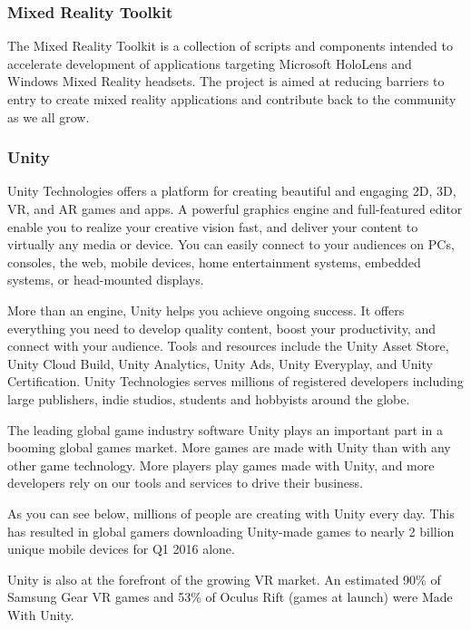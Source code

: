     \subsubsection{Mixed Reality Toolkit}
    The Mixed Reality Toolkit is a collection of scripts and components intended to accelerate development of applications targeting Microsoft HoloLens and Windows Mixed Reality headsets. The project is aimed at reducing barriers to entry to create mixed reality applications and contribute back to the community as we all grow. %

    \subsubsection{Unity}
    Unity Technologies offers a platform for creating beautiful and engaging 2D, 3D, VR, and AR games and apps. A powerful graphics engine and full-featured editor enable you to realize your creative vision fast, and deliver your content to virtually any media or device. You can easily connect to your audiences on PCs, consoles, the web, mobile devices, home entertainment systems, embedded systems, or head-mounted displays.

    More than an engine, Unity helps you achieve ongoing success. It offers everything you need to develop quality content, boost your productivity, and connect with your audience. Tools and resources include the Unity Asset Store, Unity Cloud Build, Unity Analytics, Unity Ads, Unity Everyplay, and Unity Certification. Unity Technologies serves millions of registered developers including large publishers, indie studios, students and hobbyists around the globe.
    
    The leading global game industry software
    Unity plays an important part in a booming global games market. More games are made with Unity than with any other game technology. More players play games made with Unity, and more developers rely on our tools and services to drive their business.
    
    As you can see below, millions of people are creating with Unity every day. This has resulted in global gamers downloading Unity-made games to nearly 2 billion unique mobile devices for Q1 2016 alone.
    
    Unity is also at the forefront of the growing VR market. An estimated 90\% of Samsung Gear VR games and 53\% of Oculus Rift (games at launch) were Made With Unity. %

